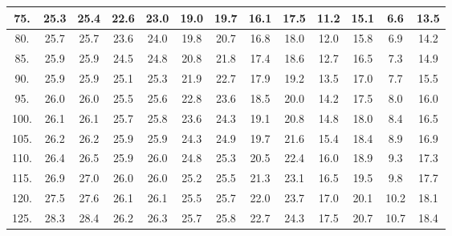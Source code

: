 \begin{tabular}{|c||c|c|c|c|c|c|c|c|c|c|c|c|}
\hline
  75. &    25.3 &    25.4 &    22.6 &    23.0 &    19.0 &    19.7 &    16.1 &    17.5 &    11.2 &    15.1 &     6.6 &    13.5\tabularnewline
\hline
  80. &    25.7 &    25.7 &    23.6 &    24.0 &    19.8 &    20.7 &    16.8 &    18.0 &    12.0 &    15.8 &     6.9 &    14.2\tabularnewline
\hline
  85. &    25.9 &    25.9 &    24.5 &    24.8 &    20.8 &    21.8 &    17.4 &    18.6 &    12.7 &    16.5 &     7.3 &    14.9\tabularnewline
\hline
  90. &    25.9 &    25.9 &    25.1 &    25.3 &    21.9 &    22.7 &    17.9 &    19.2 &    13.5 &    17.0 &     7.7 &    15.5\tabularnewline
\hline
  95. &    26.0 &    26.0 &    25.5 &    25.6 &    22.8 &    23.6 &    18.5 &    20.0 &    14.2 &    17.5 &     8.0 &    16.0\tabularnewline
\hline
 100. &    26.1 &    26.1 &    25.7 &    25.8 &    23.6 &    24.3 &    19.1 &    20.8 &    14.8 &    18.0 &     8.4 &    16.5\tabularnewline
\hline
 105. &    26.2 &    26.2 &    25.9 &    25.9 &    24.3 &    24.9 &    19.7 &    21.6 &    15.4 &    18.4 &     8.9 &    16.9\tabularnewline
\hline
 110. &    26.4 &    26.5 &    25.9 &    26.0 &    24.8 &    25.3 &    20.5 &    22.4 &    16.0 &    18.9 &     9.3 &    17.3\tabularnewline
\hline
 115. &    26.9 &    27.0 &    26.0 &    26.0 &    25.2 &    25.5 &    21.3 &    23.1 &    16.5 &    19.5 &     9.8 &    17.7\tabularnewline
\hline
 120. &    27.5 &    27.6 &    26.1 &    26.1 &    25.5 &    25.7 &    22.0 &    23.7 &    17.0 &    20.1 &    10.2 &    18.1\tabularnewline
\hline
 125. &    28.3 &    28.4 &    26.2 &    26.3 &    25.7 &    25.8 &    22.7 &    24.3 &    17.5 &    20.7 &    10.7 &    18.4\tabularnewline
\hline
\end{tabular}
